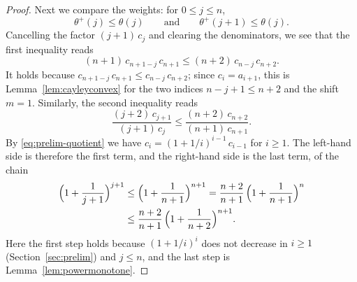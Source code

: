 \documentclass{amsart}
\theoremstyle{definition}
\theoremstyle{remark}
\numberwithin{equation}{section}
\begin{document}
\begin{proof}
Next we compare the weights: for $0\le j\le n$,
\begin{equation}\label{eq:diagonal-weights}
\theta^{+}(j)\le\theta(j)\qquad\text{and}\qquad\theta^{+}(j+1)\le\theta(j).
\end{equation}
Cancelling the factor $(j+1)\,c_j$ and clearing the denominators, we see
that the first inequality reads
\[
(n+1)\,c_{n+1-j}\,c_{n+1}\le(n+2)\,c_{n-j}\,c_{n+2}.
\]
It holds because $c_{n+1-j}\,c_{n+1}\le c_{n-j}\,c_{n+2}$; since
$c_i=a_{i+1}$, this is Lemma~\ref{lem:cayleyconvex} for the two indices
$n-j+1\le n+2$ and the shift $m=1$. Similarly, the second inequality reads
\[
\frac{(j+2)\,c_{j+1}}{(j+1)\,c_j}\le\frac{(n+2)\,c_{n+2}}{(n+1)\,c_{n+1}}.
\]
By \eqref{eq:prelim-quotient} we have $c_i=(1+1/i)^{i-1}\,c_{i-1}$ for
$i\ge1$. The left-hand side is therefore the first term, and the right-hand
side is the last term, of the chain
\begin{align*}
\Bigl(1+\frac1{j+1}\Bigr)^{j+1}
&\le\Bigl(1+\frac1{n+1}\Bigr)^{n+1}
=\frac{n+2}{n+1}\,\Bigl(1+\frac1{n+1}\Bigr)^{n}\\
&\le\frac{n+2}{n+1}\,\Bigl(1+\frac1{n+2}\Bigr)^{n+1}.
\end{align*}
Here the first step holds because $(1+1/i)^i$ does not decrease in $i\ge1$
(Section~\ref{sec:prelim}) and $j\le n$, and the last step is
Lemma~\ref{lem:powermonotone}.


\end{proof}
\end{document}
